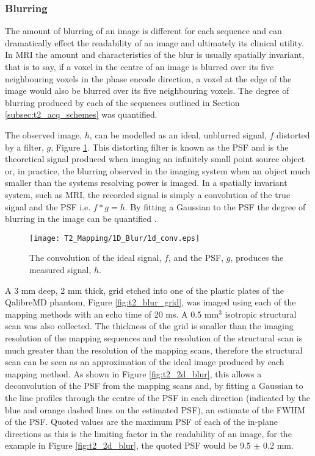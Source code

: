 \newpage
\subsubsection{Blurring}
The amount of blurring of an image is different for each sequence and can dramatically effect the readability of an image and ultimately its clinical utility. In \ac{MRI} the amount and characteristics of the blur is usually spatially invariant, that is to say, if a voxel in the centre of an image is blurred over its five neighbouring voxels in the phase encode direction, a voxel at the edge of the image would also be blurred over its five neighbouring voxels. The degree of blurring produced by each of the sequences outlined in Section \ref{subsec:t2_acq_schemes} was quantified.

The observed image, $h$, can be modelled as an ideal, unblurred signal, $f$ distorted by a filter, $g$, Figure \ref{fig:t2_1d_blur}. This distorting filter is known as the \ac{PSF} and is the theoretical signal produced when imaging an infinitely small point source object or, in practice, the blurring observed in the imaging system when an object much smaller than the systems resolving power is imaged. In a spatially invariant system, such as \ac{MRI}, the recorded signal is simply a convolution of the true signal and the \ac{PSF} i.e. $f \ast g = h$. By fitting a Gaussian to the \ac{PSF} the degree of blurring in the image can be quantified \cite{chaimow_more_2017, chaimow_more_2017-1}. 
\begin{figure}[H]
	\centering
	\texttt{[image: T2\_Mapping/1D\_Blur/1d\_conv.eps]}
	\caption{The convolution of the ideal signal, $f$, and the \ac{PSF}, $g$, produces the measured signal, $h$.}
	\label{fig:t2_1d_blur}	
\end{figure}

A 3 mm deep, 2 mm thick, grid etched into one of the plastic plates of the QalibreMD phantom, Figure \ref{fig:t2_blur_grid}, was imaged using each of the \ttwo mapping methods with an echo time of 20 ms. A 0.5 mm$^3$ isotropic structural scan was also collected. The thickness of the grid is smaller than the imaging resolution of the \ttwo mapping sequences and the resolution of the structural scan is much greater than the resolution of the \ttwo mapping scans, therefore the structural scan can be seen as an approximation of the ideal image produced by each \ttwo mapping method. As shown in Figure \ref{fig:t2_2d_blur}, this allows a deconvolution of the \ac{PSF} from the \ttwo mapping scans and, by fitting a Gaussian to the line profiles through the centre of the \ac{PSF} in each direction (indicated by the blue and orange dashed lines on the estimated \ac{PSF}), an estimate of the \ac{FWHM} of the \ac{PSF}. Quoted values are the maximum \ac{PSF} of each of the in-plane directions as this is the limiting factor in the readability of an image, for the example in Figure \ref{fig:t2_2d_blur}, the quoted \ac{PSF} would be 9.5 $\pm$ 0.2 mm.

